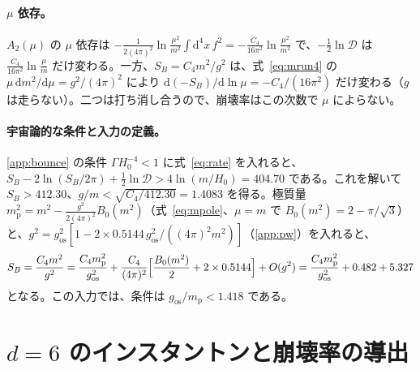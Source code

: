 \documentclass[a4paper,10pt]{ltjsarticle}
\newcommand{\dd}{\mathrm{d}}
\begin{document}
\paragraph{$\mu$ 依存。}$A_2(\mu)$ の $\mu$ 依存は $-\frac{1}{2(4\pi)^2}\ln\frac{\mu^2}{m^2}\int\dd^4x\,f^2=-\frac{C_4}{16\pi^2}\ln\frac{\mu^2}{m^2}$ で、$-\frac12\ln\mathcal D$ は $\frac{C_4}{16\pi^2}\ln\frac{\mu}{m}$ だけ変わる。一方、$S_B=C_4m^2/g^2$ は、式~\eqref{eq:mrun4} の $\mu\,\dd m^2/\dd\mu=g^2/(4\pi)^2$ により $\dd(-S_B)/\dd\ln\mu=-C_4/(16\pi^2)$ だけ変わる（$g$ は走らない）。二つは打ち消し合うので、崩壊率はこの次数で $\mu$ によらない。

\paragraph{宇宙論的な条件と入力の定義。}\ref{app:bounce} の条件 $\Gamma H_0^{-4}<1$ に式~\eqref{eq:rate} を入れると、$S_B-2\ln(S_B/2\pi)+\frac12\ln\mathcal D>4\ln(m/H_0)=404.70$ である。これを解いて $S_B>412.30$、$g/m<\sqrt{C_4/412.30}=1.4083$ を得る。極質量 $m_{\mathrm p}^2=m^2-\frac{g^2}{2(4\pi)^2}B_0(m^2)$（式~\eqref{eq:mpole}、$\mu=m$ で $B_0(m^2)=2-\pi/\sqrt3$）と、$g^2=g_{\mathrm{os}}^2[1-2\times0.5144\,g_{\mathrm{os}}^2/((4\pi)^2m^2)]$（\ref{app:pw}）を入れると、
\begin{equation*}
S_B=\frac{C_4m^2}{g^2}=\frac{C_4m_{\mathrm p}^2}{g_{\mathrm{os}}^2}+\frac{C_4}{(4\pi)^2}\Bigl[\frac{B_0(m^2)}{2}+2\times0.5144\Bigr]+O(g^2)=\frac{C_4m_{\mathrm p}^2}{g_{\mathrm{os}}^2}+0.482+5.327
\end{equation*}
となる。この入力では、条件は $g_{\mathrm{os}}/m_{\mathrm p}<1.418$ である。

\section{$d=6$ のインスタントンと崩壊率の導出}\label{app:instanton6}
\end{document}
